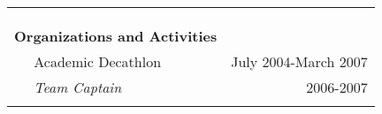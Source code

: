 \documentclass{article}
\begin{document}
\begin{tabular}{llr}
{}\\
\\
\cline{2-3}\\
\multicolumn{2}{l}{{\large\bf Organizations and Activities} \vspace{1mm}}& \\
& Academic Decathlon & July 2004-March 2007\\
& \emph{   Team Captain} & 2006-2007 \\
\\

\end{tabular}
\end{document}

